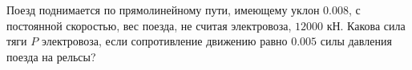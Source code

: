 Поезд поднимается по прямолинейному пути, имеющему уклон $0.008$, с
постоянной скоростью, вес поезда, не считая электровоза, $12000$ кН.
Какова сила тяги $P$ электровоза, если сопротивление движению равно
$0.005$ силы давления поезда на рельсы?
